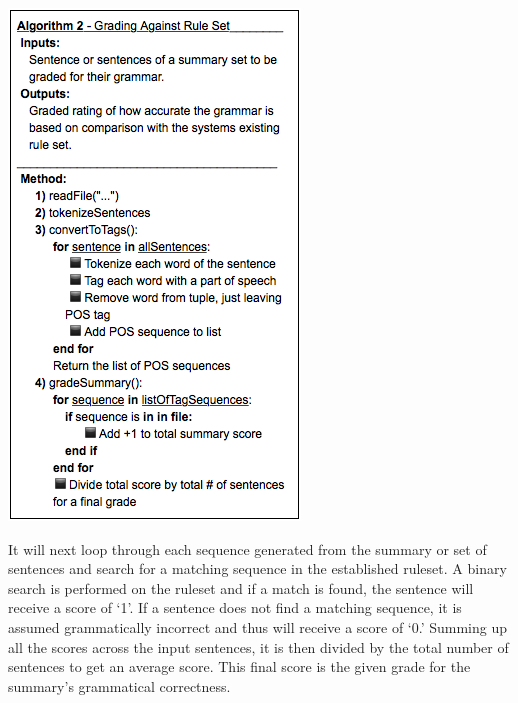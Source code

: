 \documentclass[11pt,a4paper]{article}
\newenvironment{Figure}
  {\par\medskip\noindent\minipage{\linewidth}}
  {\endminipage\par\medskip}
\begin{document}
\begin{multicols}{2}
\begin{Figure}  
   \centering
   \includegraphics[width=\linewidth]{GradeAlgorithm}
\end{Figure} 

It will next loop through each sequence generated from the summary or set of sentences and search for a matching sequence in the established ruleset. A binary search is performed on the ruleset and if a match is found, the sentence will receive a score of `1'. If a sentence does not find a matching sequence, it is assumed grammatically incorrect and thus will receive a score of `0.' Summing up all the scores across the input sentences, it is then divided by the total number of sentences to get an average score. This final score is the given grade for the summary's grammatical correctness.


\end{multicols}
\end{document}
